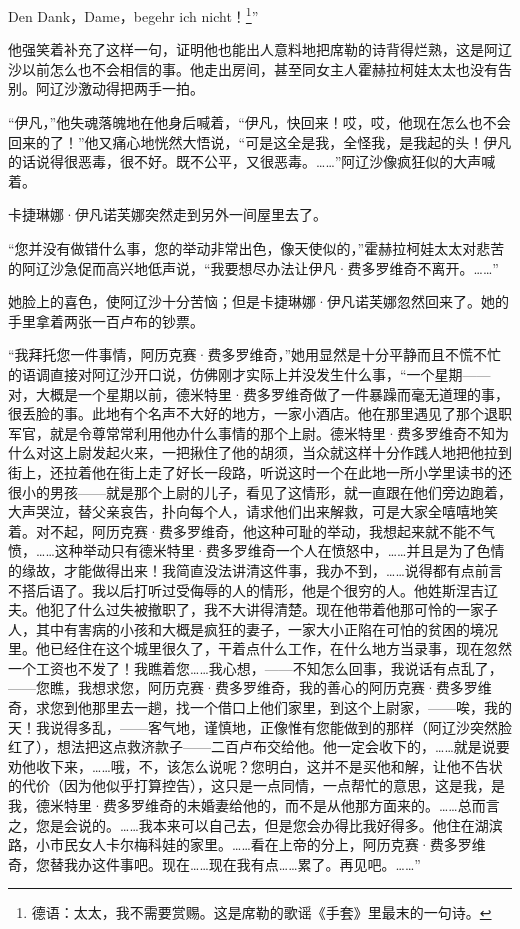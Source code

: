 \par Den Dank，Dame，begehr ich nicht！\footnote{德语：太太，我不需要赏赐。这是席勒的歌谣《手套》里最末的一句诗。}”
\par 他强笑着补充了这样一句，证明他也能出人意料地把席勒的诗背得烂熟，这是阿辽沙以前怎么也不会相信的事。他走出房间，甚至同女主人霍赫拉柯娃太太也没有告别。阿辽沙激动得把两手一拍。
\par “伊凡，”他失魂落魄地在他身后喊着，“伊凡，快回来！哎，哎，他现在怎么也不会回来的了！”他又痛心地恍然大悟说，“可是这全是我，全怪我，是我起的头！伊凡的话说得很恶毒，很不好。既不公平，又很恶毒。……”阿辽沙像疯狂似的大声喊着。
\par 卡捷琳娜·伊凡诺芙娜突然走到另外一间屋里去了。
\par “您并没有做错什么事，您的举动非常出色，像天使似的，”霍赫拉柯娃太太对悲苦的阿辽沙急促而高兴地低声说，“我要想尽办法让伊凡·费多罗维奇不离开。……”
\par 她脸上的喜色，使阿辽沙十分苦恼；但是卡捷琳娜·伊凡诺芙娜忽然回来了。她的手里拿着两张一百卢布的钞票。
\par “我拜托您一件事情，阿历克赛·费多罗维奇，”她用显然是十分平静而且不慌不忙的语调直接对阿辽沙开口说，仿佛刚才实际上并没发生什么事，“一个星期——对，大概是一个星期以前，德米特里·费多罗维奇做了一件暴躁而毫无道理的事，很丢脸的事。此地有个名声不大好的地方，一家小酒店。他在那里遇见了那个退职军官，就是令尊常常利用他办什么事情的那个上尉。德米特里·费多罗维奇不知为什么对这上尉发起火来，一把揪住了他的胡须，当众就这样十分作践人地把他拉到街上，还拉着他在街上走了好长一段路，听说这时一个在此地一所小学里读书的还很小的男孩——就是那个上尉的儿子，看见了这情形，就一直跟在他们旁边跑着，大声哭泣，替父亲哀告，扑向每个人，请求他们出来解救，可是大家全嘻嘻地笑着。对不起，阿历克赛·费多罗维奇，他这种可耻的举动，我想起来就不能不气愤，……这种举动只有德米特里·费多罗维奇一个人在愤怒中，……并且是为了色情的缘故，才能做得出来！我简直没法讲清这件事，我办不到，……说得都有点前言不搭后语了。我以后打听过受侮辱的人的情形，他是个很穷的人。他姓斯涅吉辽夫。他犯了什么过失被撤职了，我不大讲得清楚。现在他带着他那可怜的一家子人，其中有害病的小孩和大概是疯狂的妻子，一家大小正陷在可怕的贫困的境况里。他已经住在这个城里很久了，干着点什么工作，在什么地方当录事，现在忽然一个工资也不发了！我瞧着您……我心想，——不知怎么回事，我说话有点乱了，——您瞧，我想求您，阿历克赛·费多罗维奇，我的善心的阿历克赛·费多罗维奇，求您到他那里去一趟，找一个借口上他们家里，到这个上尉家，——唉，我的天！我说得多乱，——客气地，谨慎地，正像惟有您能做到的那样（阿辽沙突然脸红了），想法把这点救济款子——二百卢布交给他。他一定会收下的，……就是说要劝他收下来，……哦，不，该怎么说呢？您明白，这并不是买他和解，让他不告状的代价（因为他似乎打算控告），这只是一点同情，一点帮忙的意思，这是我，是我，德米特里·费多罗维奇的未婚妻给他的，而不是从他那方面来的。……总而言之，您是会说的。……我本来可以自己去，但是您会办得比我好得多。他住在湖滨路，小市民女人卡尔梅科娃的家里。……看在上帝的分上，阿历克赛·费多罗维奇，您替我办这件事吧。现在……现在我有点……累了。再见吧。……”
